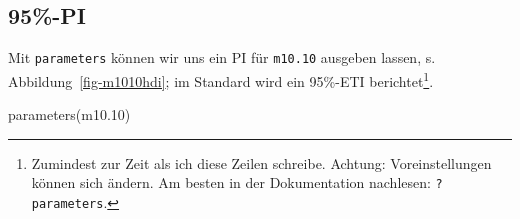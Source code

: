 \documentclass[
  a4paper,
  DIV=11]{scrreprt}
\newenvironment{Shaded}{\begin{snugshade}}{\end{snugshade}}
\newcommand{\FloatTok}[1]{\textcolor[rgb]{0.68,0.00,0.00}{#1}}
\newcommand{\FunctionTok}[1]{\textcolor[rgb]{0.28,0.35,0.67}{#1}}
\newcommand{\NormalTok}[1]{\textcolor[rgb]{0.00,0.23,0.31}{#1}}
\theoremstyle{definition}
\theoremstyle{remark}
\begin{document}
\hypertarget{pi}{%
\subsection{95\%-PI}\label{pi}}

Mit \texttt{parameters} können wir uns ein PI für \texttt{m10.10}
ausgeben lassen, s. Abbildung~\ref{fig-m1010hdi}; im Standard wird ein
95\%-ETI berichtet\footnote{Zumindest zur Zeit als ich diese Zeilen
  schreibe. Achtung: Voreinstellungen können sich ändern. Am besten in
  der Dokumentation nachlesen: \texttt{?parameters}.}.

\begin{Shaded}
\begin{Highlighting}[]
\FunctionTok{parameters}\NormalTok{(m10}\FloatTok{.10}\NormalTok{) }
\end{Highlighting}
\end{Shaded}
\end{document}
